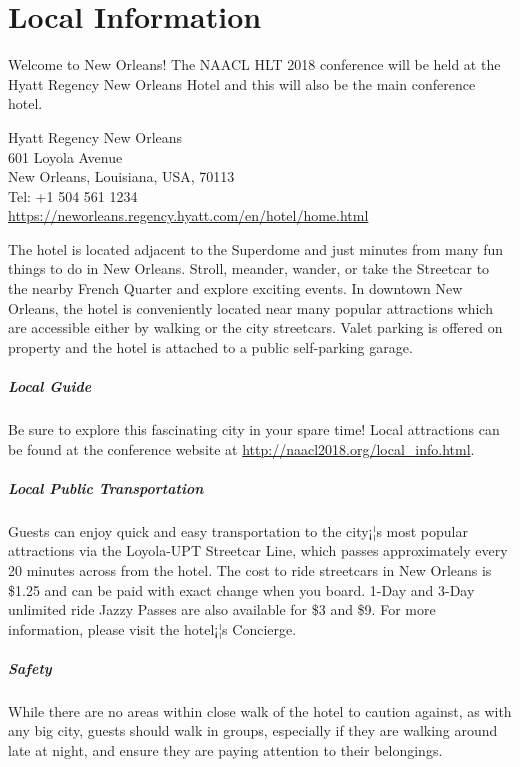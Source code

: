 \chapter{Local Information}

Welcome to New Orleans!  The NAACL HLT 2018 conference will be held at the Hyatt Regency New Orleans Hotel and this will also be the main conference hotel.

Hyatt Regency New Orleans \\
601 Loyola Avenue \\
New Orleans, Louisiana, USA, 70113 \\
Tel: +1 504 561 1234\\
\url{https://neworleans.regency.hyatt.com/en/hotel/home.html}

The hotel is located adjacent to the Superdome and just minutes from many fun things to do in New Orleans. Stroll, meander, wander, or take the Streetcar to the nearby French Quarter and explore exciting events.  In downtown New Orleans, the hotel is conveniently located near many popular attractions which are accessible either by walking or the city streetcars. Valet parking is offered on property and the hotel is attached to a public self-parking garage. 

\paragraph{Local Guide}

Be sure to explore this fascinating city in your spare time!  Local attractions can be found at the conference website at \url{http://naacl2018.org/local_info.html}.


\paragraph{Local Public Transportation}

Guests can enjoy quick and easy transportation to the city¡¦s most popular attractions via the Loyola-UPT Streetcar Line, which passes approximately every 20 minutes across from the hotel. The cost to ride streetcars in New Orleans is \$1.25 and can be paid with exact change when you board. 1-Day and 3-Day unlimited ride Jazzy Passes are also available for \$3 and \$9. For more information, please visit the hotel¡¦s Concierge.

\paragraph{Safety}

While there are no areas within close walk of the hotel to caution against, as with any big city, guests should walk in groups, especially if they are walking around late at night, and ensure they are paying attention
to their belongings.

